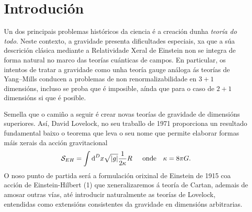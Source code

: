\section{Introdución}



Un dos principais problemas históricos da ciencia é a creación dunha \textit{teoría do todo}. Neste contexto, a gravidade presenta dificultades especiais, xa que a súa descrición clásica mediante a Relatividade Xeral de Einstein non se integra de forma natural no marco das teorías cuánticas de campos. En particular, os intentos de tratar a gravidade como unha teoría gauge análoga ás teorías de Yang–Mills conducen a problemas de non renormalizabilidade en $3+1$ dimensións, incluso se proba que é imposible, aínda que para o caso de $2+1$ dimensións \cite{2+1grav0,2+1grav1} si que é posible.

Semella que o camiño a seguir é crear novas teorías de gravidade de dimensións superiores. Así, David Lovelock, no seu traballo de 1971 \cite{Lovelock-1971} proporciona un resultado fundamental baixo o teorema que leva o seu nome que permite elaborar formas máis xerais da acción gravitacional
\begin{align}
    \mathcal{S}_{EH}=\int \text{d}^D x \sqrt{|g|} \frac{1}{2\kappa}R \hspace{1.5em} \text{onde} \hspace{1em} \kappa=8\pi G.
\end{align}
O noso punto de partida será a formulación orixinal de Einstein de 1915 coa acción de Einstein-Hilbert (1) que xeneralizaremos á teoría de Cartan, ademais de amosar outras vías, até introducir naturalmente as teorías de Lovelock, entendidas como extensións consistentes da gravidade en dimensións arbitrarias.

